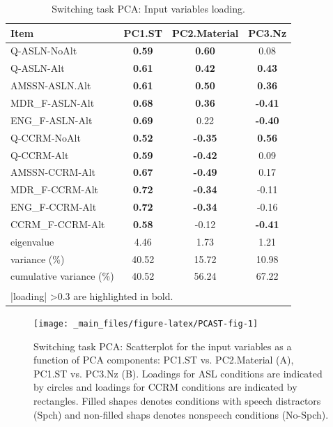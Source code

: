 \documentclass[a4paper, twoside]{templates/ociamthesis}
\begin{document}
\begin{table}

\caption{\label{tab:PCAST-Tab}Switching task PCA: Input variables loading.}
\centering
\begin{tabular}[t]{lccc}
\toprule
Item & PC1.ST & PC2.Material & PC3.Nz\\
\midrule
Q-ASLN-NoAlt & \textbf{0.59} & \textbf{0.60} & 0.08\\
Q-ASLN-Alt & \textbf{0.61} & \textbf{0.42} & \textbf{0.43}\\
AMSSN-ASLN.Alt & \textbf{0.61} & \textbf{0.50} & \textbf{0.36}\\
MDR\_F-ASLN-Alt & \textbf{0.68} & \textbf{0.36} & \textbf{-0.41}\\
ENG\_F-ASLN-Alt & \textbf{0.69} & 0.22 & \textbf{-0.40}\\
Q-CCRM-NoAlt & \textbf{0.52} & \textbf{-0.35} & \textbf{0.56}\\
Q-CCRM-Alt & \textbf{0.59} & \textbf{-0.42} & 0.09\\
AMSSN-CCRM-Alt & \textbf{0.67} & \textbf{-0.49} & 0.17\\
MDR\_F-CCRM-Alt & \textbf{0.72} & \textbf{-0.34} & -0.11\\
ENG\_F-CCRM-Alt & \textbf{0.72} & \textbf{-0.34} & -0.16\\
CCRM\_F-CCRM-Alt & \textbf{0.58} & -0.12 & \textbf{-0.41}\\
\midrule
eigenvalue & 4.46 & 1.73 & 1.21\\
variance (\%) & 40.52 & 15.72 & 10.98\\
cumulative variance (\%) & 40.52 & 56.24 & 67.22\\
\bottomrule
\multicolumn{4}{l}{\textsuperscript{} |loading| >0.3 are highlighted in bold.}\\
\end{tabular}
\end{table}

\begin{figure}

{\centering \texttt{[image: \_main\_files/figure-latex/PCAST-fig-1]} 

}

\caption{Switching task PCA: Scatterplot for the input variables as a function of PCA components: PC1.ST vs. PC2.Material (A), PC1.ST vs. PC3.Nz (B). Loadings for ASL conditions are indicated by circles and loadings for CCRM conditions are indicated by rectangles. Filled shapes denotes conditions with speech distractors (Spch) and non-filled shaps denotes nonspeech conditions (No-Spch).}\label{fig:PCAST-fig}
\end{figure}
\end{document}

